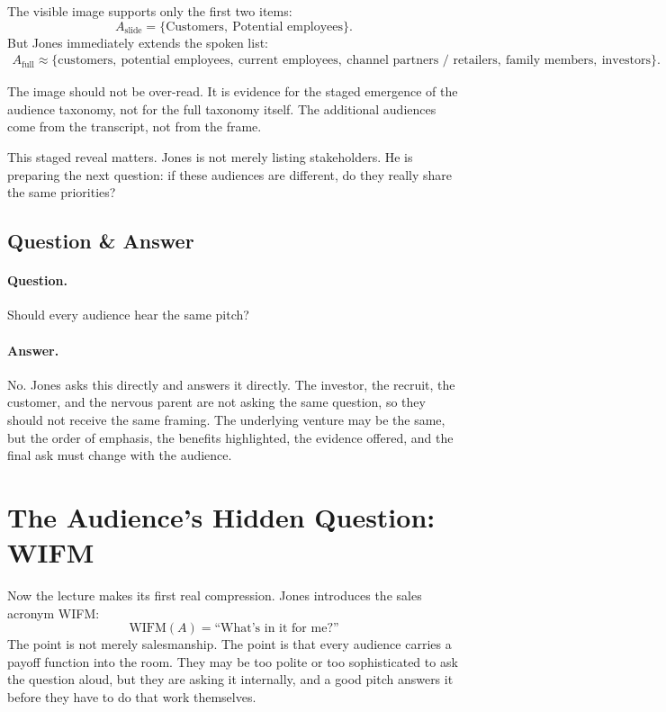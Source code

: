 The visible image supports only the first two items:
\begin{equation}
A_{\text{slide}}=\{\text{Customers},\ \text{Potential employees}\}.
\end{equation}
But Jones immediately extends the spoken list:
\begin{align}
A_{\text{full}} \approx \{\text{customers},\ \text{potential employees},\ \text{current employees},\ \text{channel partners / retailers},\ \text{family members},\ \text{investors}\}.
\end{align}

\begin{remark}
The image should not be over-read. It is evidence for the staged emergence of the audience taxonomy, not for the full taxonomy itself. The additional audiences come from the transcript, not from the frame.
\end{remark}

This staged reveal matters. Jones is not merely listing stakeholders. He is preparing the next question: if these audiences are different, do they really share the same priorities?

\subsection{Question \& Answer}

\paragraph{Question.} Should every audience hear the same pitch?

\paragraph{Answer.} No. Jones asks this directly and answers it directly. The investor, the recruit, the customer, and the nervous parent are not asking the same question, so they should not receive the same framing. The underlying venture may be the same, but the order of emphasis, the benefits highlighted, the evidence offered, and the final ask must change with the audience.

\section{The Audience's Hidden Question: WIFM}

Now the lecture makes its first real compression. Jones introduces the sales acronym WIFM:
\begin{equation}
\mathrm{WIFM}(A)=\text{``What's in it for me?''}
\end{equation}
The point is not merely salesmanship. The point is that every audience carries a payoff function into the room. They may be too polite or too sophisticated to ask the question aloud, but they are asking it internally, and a good pitch answers it before they have to do that work themselves.

